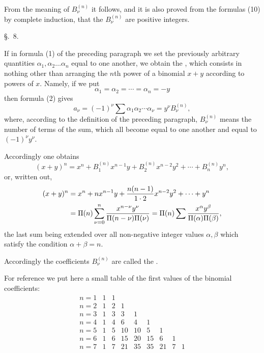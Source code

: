 
From the meaning of $B_\nu^{(n)}$ it follows, and it is also proved from the formulas (10) by complete induction, that the $B_\nu^{(n)}$ are positive integers.

\begin{center}
{\large \S.\ 8.}

\vspace{0.5em}
{\large{}}
\end{center}

If in formula (1) of the preceding paragraph we set the previously arbitrary quantities $\alpha_1,\alpha_2\ldots\alpha_n$ equal to one another, we obtain the , which consists in nothing other than arranging the $n$th power of a binomial $x+y$ according to powers of $x$. Namely, if we put
\[
 \alpha_1=\alpha_2=\cdots=\alpha_n=-y
\]
then formula (2) gives
\[
 a_\nu=(-1)^\nu\sum \alpha_1\alpha_2\cdots\alpha_\nu=y^\nu B_\nu^{(n)},
\]
where, according to the definition of the preceding paragraph, $B_\nu^{(n)}$ means the number of terms of the sum, which all become equal to one another and equal to $(-1)^\nu y^\nu$.

Accordingly one obtains
\begin{equation}
 (x+y)^n=x^n+B_1^{(n)}x^{n-1}y+B_2^{(n)}x^{n-2}y^2+\cdots+B_n^{(n)}y^n,
\tag{1}
\end{equation}
or, written out,
\[
\begin{aligned}
(x+y)^n
&=x^n+nx^{n-1}y+{n(n-1)\over1\cdot2}x^{n-2}y^2+\cdots+y^n\\
&=\Pi(n)\sum_{\nu=0}^{n} {x^{n-\nu}y^\nu\over \Pi(n-\nu)\Pi(\nu)}
 =\Pi(n)\sum {x^\alpha y^\beta\over \Pi(\alpha)\Pi(\beta)},
\end{aligned}
\]
the last sum being extended over all non-negative integer values $\alpha,\beta$ which satisfy the condition $\alpha+\beta=n$.

Accordingly the coefficients $B_\nu^{(n)}$ are called the .

For reference we put here a small table of the first values of the binomial coefficients:
\[
\begin{array}{crrrrrrrr}
 n=1&1&1\\
 n=2&1&2&1\\
 n=3&1&3&3&1\\
 n=4&1&4&6&4&1\\
 n=5&1&5&10&10&5&1\\
 n=6&1&6&15&20&15&6&1\\
 n=7&1&7&21&35&35&21&7&1
\end{array}
\]
